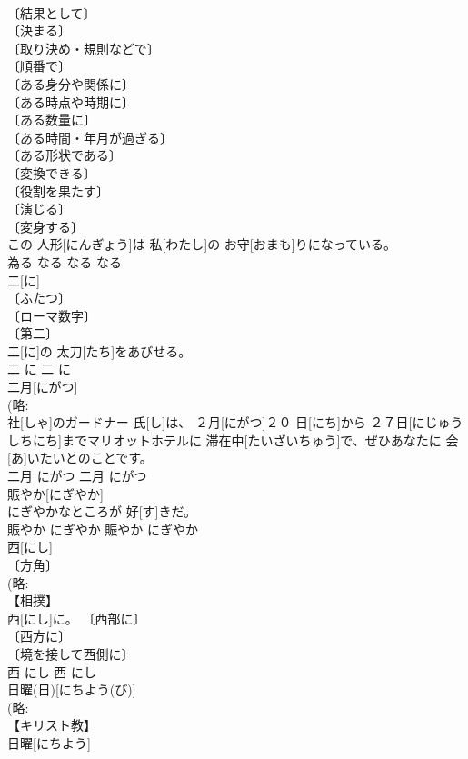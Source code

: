 \documentclass[8pt]{extreport}
\begin{document}
\begin{CJK}{UTF8}{min}
\\	〔結果として〕 
\\	〔決まる〕 
\\	〔取り決め・規則などで〕 
\\	〔順番で〕 
\\	〔ある身分や関係に〕 
\\	〔ある時点や時期に〕 
\\	〔ある数量に〕 
\\	〔ある時間・年月が過ぎる〕 
\\	〔ある形状である〕 
\\	〔変換できる〕 
\\	〔役割を果たす〕 
\\	〔演じる〕 
\\	〔変身する〕 
\\	この 人形[にんぎょう]は 私[わたし]の お守[おまも]りになっている。	
\\	為る	なる	なる	なる	
\\	二[に]	
\\	〔ふたつ〕 
\\	〔ローマ数字〕 
\\	〔第二〕 
\\	二[に]の 太刀[たち]をあびせる。	
\\	二	に	二	に	
\\	二月[にがつ]	
\\	(略: 
\\	社[しゃ]のガードナー 氏[し]は、 ２月[にがつ]２０ 日[にち]から ２７日[にじゅうしちにち]までマリオットホテルに 滞在中[たいざいちゅう]で、ぜひあなたに 会[あ]いたいとのことです。	
\\	二月	にがつ	二月	にがつ	
\\	賑やか[にぎやか]	
\\	にぎやかなところが 好[す]きだ。	
\\	賑やか	にぎやか	賑やか	にぎやか	
\\	西[にし]	
\\	〔方角〕 
\\	(略: 
\\	【相撲】 
\\	西[にし]に。	〔西部に〕 
\\	〔西方に〕 
\\	〔境を接して西側に〕 
\\	西	にし	西	にし	
\\	日曜(日)[にちよう(び)]	
\\	(略: 
\\	【キリスト教】 
\\	日曜[にちよう]

\end{CJK}
\end{document}
